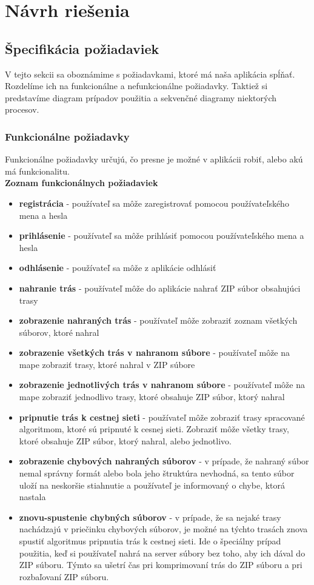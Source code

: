 \section{Návrh riešenia}
\subsection{Špecifikácia požiadaviek}
\indent \indent V tejto sekcii sa oboznámime s požiadavkami, ktoré má naša aplikácia spĺňať. Rozdelíme ich na funkcionálne a nefunkcionálne požiadavky. Taktiež si predstavíme diagram prípadov použitia a sekvenčné diagramy niektorých procesov.
\subsubsection{Funkcionálne požiadavky}
\indent \indent Funkcionálne požiadavky určujú, čo presne je možné v aplikácii robiť, alebo akú má funkcionalitu.\\
\textbf{Zoznam funkcionálnych požiadaviek}
\begin{itemize}
    \item \textbf{registrácia} - používateľ sa môže zaregistrovať pomocou používateľského mena a hesla
    \item \textbf{prihlásenie} - používateľ sa môže prihlásiť pomocou používateľského mena a hesla
    \item \textbf{odhlásenie} - používateľ sa môže z aplikácie odhlásiť
    \item \textbf{nahranie trás} - používateľ môže do aplikácie nahrať ZIP súbor obsahujúci trasy
    \item \textbf{zobrazenie nahraných trás} - používateľ môže zobraziť zoznam všetkých súborov, ktoré nahral\footnotemark{} 
    \item \textbf{zobrazenie všetkých trás v nahranom súbore} - používateľ môže na mape zobraziť trasy, ktoré nahral v ZIP súbore\footnotemark[\value{footnote}]
    \item \textbf{zobrazenie jednotlivých trás v nahranom súbore} - používateľ môže na mape zobraziť jednodlivo trasy, ktoré obsahuje ZIP súbor, ktorý nahral\footnotemark[\value{footnote}]
    \item \textbf{pripnutie trás k cestnej sieti} - používateľ môže zobraziť trasy spracované algoritmom, ktoré sú pripnuté k cesnej sieti. Zobraziť môže všetky trasy, ktoré obsahuje ZIP súbor, ktorý nahral, alebo jednotlivo. 
    \item \textbf{zobrazenie chybových nahraných súborov} - v prípade, že nahraný súbor nemal správny formát alebo bola jeho štruktúra nevhodná, sa tento súbor uloží na neskoršie stiahnutie a používateľ je informovaný o chybe, ktorá nastala
    \item \textbf{znovu-spustenie chybných súborov} - v prípade, že sa nejaké trasy nachádzajú v priečinku chybových súborov, je možné na týchto trasách znova spustiť algoritmus pripnutia trás k cestnej sieti. Ide o špeciálny prípad použitia, keď si používateľ nahrá na server súbory bez toho, aby ich dával do ZIP súboru. Týmto sa ušetrí čas pri komprimovaní trás do ZIP súboru a pri rozbaľovaní ZIP súboru.
\end{itemize}
